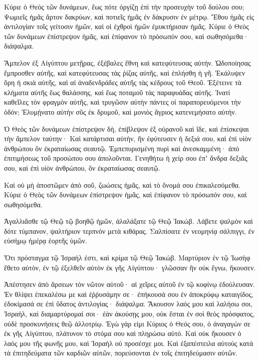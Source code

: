 \begin{spacing}{1.1}
\begin{multicols}{2}
Κύριε ὁ Θεὸς τῶν δυνάμεων, ἕως πότε ὀργίζῃ ἐπὶ τὴν προσευχὴν τοῦ δούλου σου;
Ψωμιεῖς ἡμᾶς ἄρτον δακρύων, καὶ ποτιεῖς ἡμᾶς ἐν δάκρυσιν ἐν μέτρῳ.
Ἔθου ἡμᾶς εἰς ἀντιλογίαν τοῖς γείτοσιν ἡμῶν, καὶ οἱ ἐχθροὶ ἡμῶν ἐμυκτήρισαν ἡμᾶς.
Κύριε ὁ Θεὸς τῶν δυνάμεων ἐπίστρεψον ἡμᾶς, καὶ ἐπίφανον τὸ πρόσωπόν σου, καὶ σωθησόμεθα· διάψαλμα.

Ἄμπελον ἐξ Αἰγύπτου μετῇρας, ἐξέβαλες ἔθνη καὶ κατεφύτευσας αὐτήν.
Ὡδοποίησας ἔμπροσθεν αὐτῆς, καὶ κατεφύτευσας τὰς ῥίζας αὐτῆς, καὶ ἐπλήσθη ἡ γῆ.
Ἐκάλυψεν ὄρη ἡ σκιὰ αὐτῆς, καὶ αἱ ἀναδενδράδες αὐτῆς τὰς κέδρους τοῦ Θεοῦ.
Ἐξέτεινε τὰ κλήματα αὐτῆς ἕως θαλάσσης, καὶ ἕως ποταμοῦ τὰς παραφυάδας αὐτῆς.
Ἱνατί καθεῖλες τὸν φραγμὸν αὐτῆς, καὶ τρυγῶσιν αὐτὴν πάντες οἱ παραπορευόμενοι τὴν ὁδόν;
Ἐλυμῄνατο αὐτὴν σῦς ἐκ δρυμοῦ, καὶ μονιὸς ἄγριος κατενεμήσατο αὐτήν.

Ὁ Θεὸς τῶν δυνάμεων ἐπίστρεψον δὴ, ἐπίβλεψον ἐξ οὐρανοῦ καὶ ἴδε, καὶ ἐπίσκεψαι τὴν ἄμπελον ταύτην·
Καὶ κατάρτισαι αὐτὴν, ἣν ἐφύτευσεν ἡ δεξιά σου, καὶ ἐπὶ υἱὸν ἀνθρώπου ὃν ἐκραταίωσας σεαυτῷ.
Ἐμπεπυρισμένη πυρὶ καὶ ἀνεσκαμμένη· ἀπὸ ἐπιτιμήσεως τοῦ προσώπου σου ἀπολοῦνται.
Γενηθήτω ἡ χείρ σου ἐπʼ ἄνδρα δεξιᾶς σου, καὶ ἐπὶ υἱὸν ἀνθρώπου, ὃν ἐκραταίωσας σεαυτῷ.

Καὶ οὐ μὴ ἀποστῶμεν ἀπὸ σοῦ, ζωώσεις ἡμᾶς, καὶ τὸ ὄνομά σου ἐπικαλεσόμεθα.
Κύριε ὁ Θεὸς τῶν δυνάμεων ἐπίστρεψον ἡμᾶς, καὶ ἐπίφανον τὸ πρόσωπόν σου, καὶ σωθησόμεθα.

Ἀγαλλιᾶσθε τῷ Θεῷ τῷ βοηθῷ ἡμῶν, ἀλαλάξατε τῷ Θεῷ Ἰακώβ.
Λάβετε ψαλμὸν καὶ δότε τύμπανον, ψαλτήριον τερπνὸν μετὰ κιθάρας.
Σαλπίσατε ἐν νεομηνίᾳ σάλπιγγι, ἐν εὐσήμῳ ἡμέρᾳ ἑορτῆς ὑμῶν.

Ὅτι πρόσταγμα τῷ Ἰσραήλ ἐστι, καὶ κρίμα τῷ Θεῷ Ἰακώβ.
Μαρτύριον ἐν τῷ Ἰωσὴφ ἔθετο αὐτὸν, ἐν τῷ ἐξελθεῖν αὐτὸν ἐκ γῆς Αἰγύπτου· γλῶσσαν ἣν οὐκ ἔγνω, ἤκουσεν.

Ἀπέστησεν ἀπὸ ἄρσεων τὸν νῶτον αὐτοῦ· αἱ χεῖρες αὐτοῦ ἐν τῷ κοφίνῳ ἐδούλευσαν.
Ἐν θλίψει ἐπεκαλέσω με καὶ ἐῤῥυσάμην σε· ἐπήκουσά σου ἐν ἀποκρύφῳ καταιγίδος, ἐδοκίμασά σε ἐπὶ ὕδατος ἀντιλογίας· διάψαλμα.
Ἄκουσον λαός μου καὶ λαλήσω σοι, Ἰσραὴλ, καὶ διαμαρτύρομαί σοι· ἐὰν ἀκούσῃς μου,
οὐκ ἔσται ἐν σοὶ θεὸς πρόσφατος, οὐδὲ προσκυνήσεις θεῷ ἀλλοτρίῳ.
Ἐγὼ γάρ εἰμι Κύριος ὁ Θεός σου, ὁ ἀναγαγών σε ἐκ γῆς Αἰγύπτου, πλάτυνον τὸ στόμα σου καὶ πληρώσω αὐτό.
Καὶ οὐκ ἤκουσεν ὁ λαός μου τῆς φωνῆς μου, καὶ Ἰσραὴλ οὐ προσέσχε μοι.
Καὶ ἐξαπέστειλα αὐτοὺς κατὰ τὰ ἐπιτηδεύματα τῶν καρδιῶν αὐτῶν, πορεύσονται ἐν τοῖς ἐπιτηδεύμασιν αὐτῶν.


\end{multicols}
\end{spacing}
